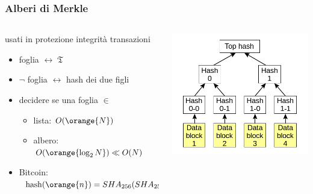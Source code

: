 \begin{frame}
	\frametitle{Alberi di Merkle}
	
\begin{columns}
 \begin{column}{.72\textwidth}

		usati in protezione {\color{blue}integrità transazioni} %
		\begin{itemize}
			\item foglia $\leftrightarrow\; \mathfrak{T}$
			\item $\neg$ foglia $\leftrightarrow$ hash dei due figli
			\vspace{5pt}
			\item decidere se una foglia $\in$ 
			\begin{itemize}
				\item lista: $O(\orange{N})$
				\item albero: $O(\orange{\log_2 N}) \ll O(N)$
				
			\end{itemize}
			\vspace{5pt}
			\item Bitcoin: $\;\mathrm{hash}(\orange{n})=SHA_{256}(SHA_{256}(\orange{\mathcal{L}_n}|\orange{\mathcal{R}_n}))$
		\end{itemize}

	\end{column}

	\begin{column}{.4\textwidth}
		\includegraphics[height = 4 cm]{images/merkle.png}
	\end{column}
\end{columns}

\end{frame}